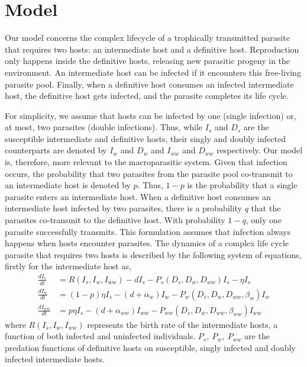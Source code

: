 \documentclass[a4paper]{scrartcl}
\begin{document}
\section*{Model}

Our model concerns the complex lifecycle of a trophically transmitted parasite that requires two hosts: an intermediate host and a definitive host. 
Reproduction only happens inside the definitive hosts, releasing new parasitic progeny in the environment. 
An intermediate host can be infected if it encounters this free-living parasite pool. 
Finally, when a definitive host consumes an infected intermediate host, the definitive host gets infected, and the parasite completes its life cycle.

For simplicity, we assume that hosts can be infected by one (single infection) or, at most, two parasites (double infections).
Thus, while $I_s$ and $D_s$ are the susceptible intermediate and definitive hosts, their singly and doubly infected counterparts are denoted by $I_w$ and $D_w$ and $I_{ww}$ and $D_{ww}$ respectively.
Our model is, therefore, more relevant to the macroparasitic system.
Given that infection occurs, the probability that two parasites from the parasite pool co-transmit to an intermediate host is denoted by  $p$. 
Thus, $1-p$ is the probability that a single parasite enters an intermediate host. 
When a definitive host consumes an intermediate host infected by two parasites, there is a probability $q$ that the parasites co-transmit to the definitive host.
With probability $1-q$, only one parasite successfully transmits. 
This formulation assumes that infection always happens when hosts encounter parasites.
The dynamics of a complex life cycle parasite that requires two hosts is described by the following system of equations, firstly for the intermediate host as,
%
\begin{align}
\frac{dI_s}{dt} &= R(I_s, I_w, I_{ww}) - d I_s - P_s(D_s, D_w, D_{ww}) I_s  - \eta  I_s \nonumber \\ 
\frac{dI_w}{dt} &=  (1 - p) \eta I_s  - (d + \alpha_w) I_w - P_w(D_s, D_w, D_{ww}, \beta_w) I_w \label{odes:ihosts} \\
\frac{dI_{ww}}{dt} &= p \eta I_s  - (d + \alpha_{ww}) I_{ww} - P_{ww}(D_s, D_w, D_{ww}, \beta_{ww}) I_{ww} \nonumber
\end{align}
%
where $R(I_s, I_w, I_{ww})$ represents the birth rate of the intermediate hosts, a function of both infected and uninfected individuals.
$P_s, \ P_w, \ P_{ww}$ are the predation functions of definitive hosts on susceptible, singly infected and doubly infected intermediate hosts. 
\end{document}
